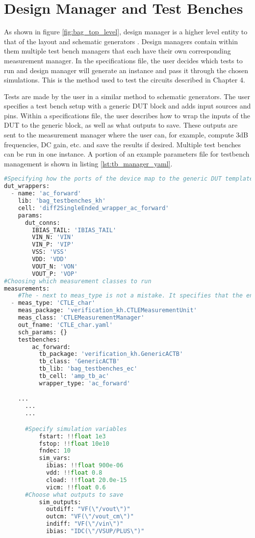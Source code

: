 \section{Design Manager and Test Benches}
As shown in figure \ref{fig:bag_top_level}, design manager is a higher level entity to that of the layout and schematic generators \cite{chang_bag2:_2018}. Design managers contain within them multiple test bench managers that each have their own corresponding measurement manager. In the specifications file, the user decides which tests to run and design manager will generate an instance and pass it through the chosen simulations. This is the method used to test the circuits described in Chapter 4. 

Tests are made by the user in a similar method to schematic generators. The user specifies a test bench setup with a generic DUT block and adds input sources and pins. Within a specifications file, the user describes how to wrap the inputs of the DUT to the generic block, as well as what outputs to save. These outputs are sent to the measurement manager where the user can, for example, compute 3dB frequencies, DC gain, etc. and save the results if desired. Multiple test benches can be run in one instance. A portion of an example parameters file for testbench management is shown in listing \ref{lst:tb_manager_yaml}.
\begin{lstlisting}[language=Python, caption=Test bench parameters, label={lst:tb_manager_yaml}, float]
#Specifying how the ports of the device map to the generic DUT template
dut_wrappers:
  - name: 'ac_forward'
    lib: 'bag_testbenches_kh'
    cell: 'diff2SingleEnded_wrapper_ac_forward'
    params:
      dut_conns:
        IBIAS_TAIL: 'IBIAS_TAIL'
        VIN_N: 'VIN'
        VIN_P: 'VIP'
        VSS: 'VSS'
        VDD: 'VDD'
        VOUT_N: 'VON'
        VOUT_P: 'VOP'
#Choosing which measurement classes to run
measurements:
    #The - next to meas_type is not a mistake. It specifies that the entire contents of measurements is a list.
  - meas_type: 'CTLE_char'
    meas_package: 'verification_kh.CTLEMeasurementUnit'
    meas_class: 'CTLEMeasurementManager'
    out_fname: 'CTLE_char.yaml'
    sch_params: {}
    testbenches:
        ac_forward:
          tb_package: 'verification_kh.GenericACTB'
          tb_class: 'GenericACTB'
          tb_lib: 'bag_testbenches_ec'
          tb_cell: 'amp_tb_ac'
          wrapper_type: 'ac_forward'

    ...
	  ...
	  ...

	  #Specify simulation variables
          fstart: !!float 1e3
          fstop: !!float 10e10
          fndec: 10
          sim_vars:
            ibias: !!float 900e-06
            vdd: !!float 0.8
            cload: !!float 20.0e-15
            vicm: !!float 0.6
	  #Choose what outputs to save
          sim_outputs:
            outdiff: "VF(\"/vout\")"
            outcm: "VF(\"/vout_cm\")"
            indiff: "VF(\"/vin\")"
            ibias: "IDC(\"/VSUP/PLUS\")"
\end{lstlisting}
